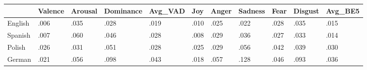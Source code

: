 \begin{tabular}{lllllllllll}
\toprule
{} & Valence & Arousal & Dominance & Avg\_VAD &  Joy & Anger & Sadness & Fear & Disgust & Avg\_BE5 \\
\midrule
English &    .006 &    .035 &      .028 &    .019 & .010 &  .025 &    .022 & .028 &    .035 &    .015 \\
Spanish &    .007 &    .060 &      .046 &    .028 & .008 &  .029 &    .036 & .027 &    .033 &    .014 \\
Polish  &    .026 &    .031 &      .051 &    .028 & .025 &  .029 &    .056 & .042 &    .039 &    .030 \\
German  &    .021 &    .056 &      .098 &    .043 & .018 &  .057 &    .128 & .046 &    .093 &    .036 \\
\bottomrule
\end{tabular}

